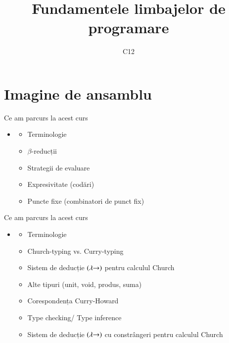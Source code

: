\documentclass[xcolor=pdftex,romanian,colorlinks]{beamer}
\title[FLP]{Fundamentele limbajelor de programare}
\subtitle{C12}
\date{}
\begin{document}
\begin{frame}
  \titlepage
\end{frame}

\section{\color{section-color} Imagine de ansamblu}
\begin{frame}{Ce am parcurs la acest curs}
\begin{itemize}
	\item {}
		\begin{itemize}
			\item Terminologie
			\item $\beta$-reducții
			\item Strategii de evaluare
			\item Expresivitate (codări)
			\item Puncte fixe (combinatori de punct fix)			
		\end{itemize}
\end{itemize}
\end{frame}

\begin{frame}{Ce am parcurs la acest curs}
\begin{itemize}
	\item {}
		\begin{itemize}
			\item Terminologie
			\item Church-typing vs. Curry-typing
			\item Sistem de deducție $(\la\hspace{-.1cm}\to)$ pentru calculul Church 
			\item Alte tipuri (unit, void, produs, suma)
			\item Corespondența Curry-Howard
			\item Type checking/ Type inference
			\item Sistem de deducție $(\la\hspace{-.1cm}\to)$ cu constrângeri pentru calculul Church 
		\end{itemize}
\end{itemize}
\end{frame}
\end{document}

